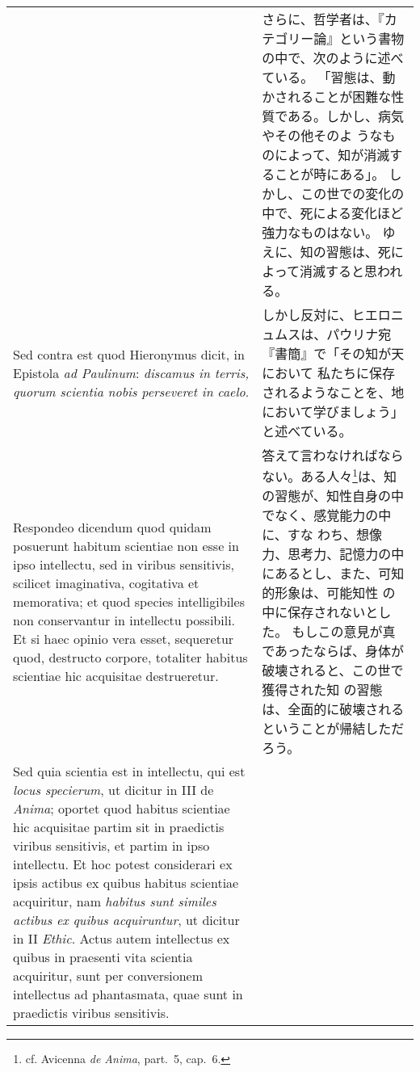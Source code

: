 \documentclass[10pt]{jsarticle} %
\begin{document}
\begin{longtable}{p{21em}p{21em}}
&

さらに、哲学者は、『カテゴリー論』という書物の中で、次のように述べている。
 「習態は、動かされることが困難な性質である。しかし、病気やその他そのよ
 うなものによって、知が消滅することが時にある」。
しかし、この世での変化の中で、死による変化ほど強力なものはない。
ゆえに、知の習態は、死によって消滅すると思われる。

\\


{\sc Sed contra est} quod Hieronymus dicit, in Epistola {\it ad
Paulinum}: {\it discamus in terris, quorum scientia nobis perseveret in
caelo}.

&

しかし反対に、ヒエロニュムスは、パウリナ宛『書簡』で「その知が天において
 私たちに保存されるようなことを、地において学びましょう」と述べている。

\\


{\sc Respondeo dicendum} quod quidam posuerunt
habitum scientiae non esse in ipso intellectu, sed in viribus
sensitivis, scilicet imaginativa, cogitativa et memorativa; et quod
species intelligibiles non conservantur in intellectu possibili. Et si
haec opinio vera esset, sequeretur quod, destructo corpore, totaliter
habitus scientiae hic acquisitae destrueretur. 

&


答えて言わなければならない。ある人々\footnote{cf. Avicenna {\it de Anima},
part.~5, cap.~6.}は、知の習態が、知性自身の中でなく、感覚能力の中に、すな
わち、想像力、思考力、記憶力の中にあるとし、また、可知的形象は、可能知性
の中に保存されないとした。
もしこの意見が真であったならば、身体が破壊されると、この世で獲得された知
 の習態は、全面的に破壊されるということが帰結しただろう。


\\



Sed quia scientia est in intellectu, qui est {\it locus specierum}, ut
dicitur in III de {\it Anima}; oportet quod habitus scientiae hic
acquisitae partim sit in praedictis viribus sensitivis, et partim in
ipso intellectu. Et hoc potest considerari ex ipsis actibus ex quibus
habitus scientiae acquiritur, nam {\it habitus sunt similes actibus ex
quibus acquiruntur}, ut dicitur in II {\it Ethic}. Actus autem
intellectus ex quibus in praesenti vita scientia acquiritur, sunt per
conversionem intellectus ad phantasmata, quae sunt in praedictis viribus
sensitivis.


&


\end{longtable}
\end{document}
